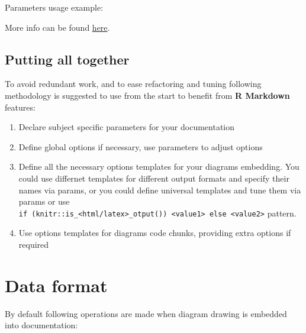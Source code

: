 \documentclass[
  12pt,
  a4paper,
  12pt,
  oneside,
  openany]{book}
\newenvironment{Shaded}{\begin{snugshade}}{\end{snugshade}}
\newcommand{\DataTypeTok}[1]{\textcolor[rgb]{0.27,0.27,0.27}{#1}}
\newcommand{\StringTok}[1]{\textcolor[rgb]{0.5,0.5,0.5}{#1}}
\begin{document}
Parameters usage example:

\begin{Shaded}
\end{Shaded}

More info can be found \href{https://bookdown.org/yihui/rmarkdown/parameterized-reports.html}{here}.

\hypertarget{usage-customize-summary}{%
\subsection{Putting all together}\label{usage-customize-summary}}

To avoid redundant work, and to ease refactoring and tuning following methodology is suggested to use from the start to benefit from \textbf{R Markdown} features:

\begin{enumerate}
\item
  Declare subject specific parameters for your documentation
\item
  Define global options if necessary, use parameters to adjust options
\item
  Define all the necessary options templates for your diagrams embedding. You could use differnet templates for different output formats and specify their names via params, or you could define universal templates and tune them via params or use \texttt{if\ (knitr::is\_\textless{}html/latex\textgreater{}\_otput())\ \textless{}value1\textgreater{}\ else\ \textless{}value2\textgreater{}} pattern.
\item
  Use options templates for diagrams code chunks, providing extra options if required
\end{enumerate}

\hypertarget{usage-format}{%
\section{Data format}\label{usage-format}}

By default following operations are made when diagram drawing is embedded into documentation:
\end{document}
